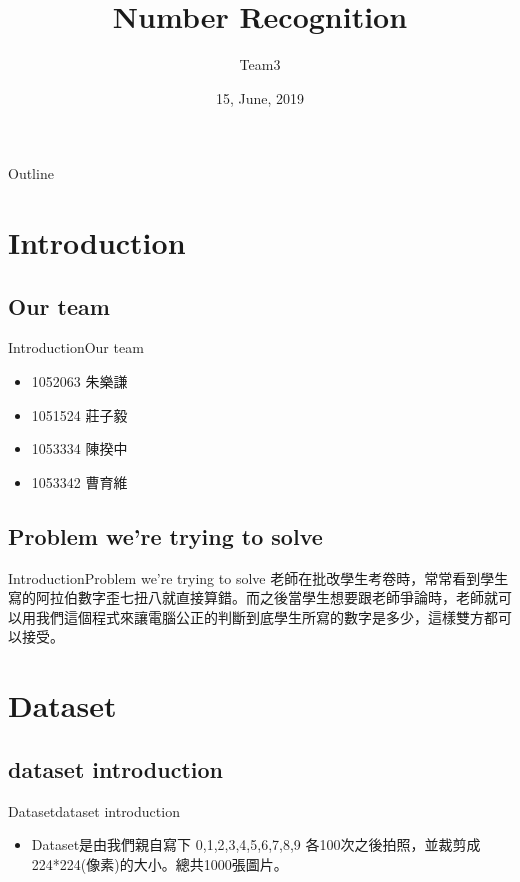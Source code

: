 \documentclass{beamer}
\title{Number Recognition}
\author{Team3}
\date{15, June, 2019}
\begin{document}
\begin{CJK*}{UTF8}{bsmi}
\begin{frame}
  \titlepage
\end{frame}

\begin{frame}{Outline}
  \tableofcontents
\end{frame}

\section{Introduction}
\subsection*{Our team}
\begin{frame}{Introduction}{Our team}
  \begin{itemize}
  \item {
    1052063 朱樂謙    
  }
  \item {
    1051524 莊子毅
  }
  \item {
    1053334 陳揆中
  }
  \item {
    1053342 曹育維
  }
  \end{itemize}
\end{frame}
\subsection*{Problem we're trying to solve}
\begin{frame}{Introduction}{Problem we're trying to solve}
老師在批改學生考卷時，常常看到學生寫的阿拉伯數字歪七扭八就直接算錯。而之後當學生想要跟老師爭論時，老師就可以用我們這個程式來讓電腦公正的判斷到底學生所寫的數字是多少，這樣雙方都可以接受。
\end{frame}


\section{Dataset}
\subsection*{dataset introduction}
\begin{frame}{Dataset}{dataset introduction}
  \begin{itemize}
  \item {
   Dataset是由我們親自寫下 0,1,2,3,4,5,6,7,8,9 各100次之後拍照，並裁剪成 224*224(像素)的大小。總共1000張圖片。
  }
  \end{itemize}
\end{frame}

\end{CJK*}
\end{document}
